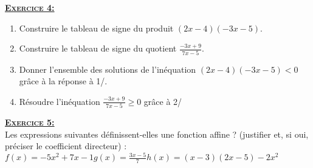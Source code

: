 \documentclass[12pt,a4paper]{article}
\begin{document}
\vspace{0,5cm}

\textbf{\textsc{\underline{Exercice 4:}}}\medskip
\begin{enumerate}
\item Construire le tableau de signe du produit $(2x-4)(-3x-5)$.\medskip
\item Construire le tableau de signe du quotient $\frac{-3x+9}{7x-5}$.\medskip
\item Donner l'ensemble des solutions de l'inéquation $(2x-4)(-3x-5)<0$ grâce à la réponse à 1/.\medskip
\item Résoudre l'inéquation $\frac{-3x+9}{7x-5}\geqslant0$ grâce à 2/
\end{enumerate}
\vspace{0,5cm}
\textbf{\textsc{\underline{Exercice 5:}}}\medskip\\
Les expressions suivantes définissent-elles une fonction affine ? (justifier et, si oui, préciser le coefficient directeur) :\medskip\\
$f(x)=-5x^2+7x-1$\hfill $g(x)=\frac{3x-5}{7}$\hfill $h(x)=(x-3)(2x-5)-2x^2$
\end{document}
